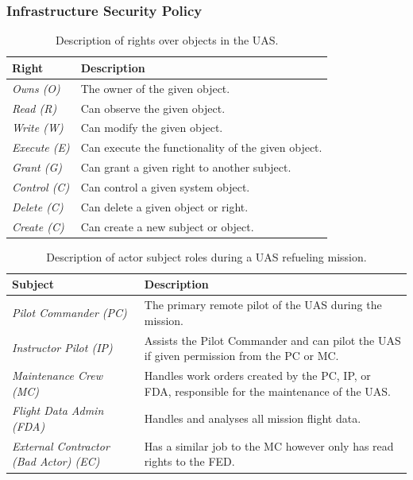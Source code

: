 \documentclass[10pt,journal,compsoc]{IEEEtran}
\begin{document}
\subsubsection{Infrastructure Security Policy}

\begin{table}[]
  \caption{Description of rights over objects in the UAS.}
  \begin{tabular}{ll}
  \hline
  \textbf{Right}       & \textbf{Description}                               \\ 
  \hline
  \textit{Owns (O)}    & The owner of the given object.                     \\
  \textit{Read (R)}    & Can observe the given object.                      \\
  \textit{Write (W)}   & Can modify the given object.                       \\
  \textit{Execute (E)} & Can execute the functionality of the given object. \\
  \textit{Grant (G)}   & Can grant a given right to another subject.        \\
  \textit{Control (C)} & Can control a given system object.                 \\
  \textit{Delete (C)}  & Can delete a given object or right.                 \\
  \textit{Create (C)}  & Can create a new subject or object.                 \\
  \hline
  \end{tabular}
\end{table}

\begin{table}[]
  \caption{Description of actor subject roles during a UAS refueling mission.}
  \begin{tabular}{ll}
  \hline
  \textbf{Subject}                           & \textbf{Description}                                                                                       \\ 
  \hline
  \textit{Pilot Commander (PC)}                  & The primary remote pilot of the UAS during the mission.                                                    \\
  \textit{Instructor Pilot (IP)}                 & Assists the Pilot Commander and can pilot the UAS if given permission from the PC or MC.                   \\
  \textit{Maintenance Crew (MC)}                 & Handles work orders created by the PC, IP, or FDA, responsible for the maintenance of the UAS.             \\
  \textit{Flight Data Admin (FDA)}               & Handles and analyses all mission flight data.                                                              \\
  \textit{External Contractor (Bad Actor) (EC)}  & Has a similar job to the MC however only has read rights to the FED.                                       \\
  \hline
  \end{tabular}
\end{table}
\end{document}
